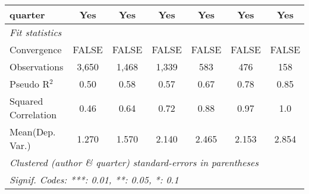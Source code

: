 \begin{tabular}{lcccccc}
   quarter                                                    & Yes          & Yes           & Yes          & Yes           & Yes           & Yes\\  
   \midrule
   \emph{Fit statistics}\\
   Convergence                                                &FALSE         & FALSE         & FALSE        & FALSE         & FALSE         & FALSE\\  
   Observations                                               & 3,650        & 1,468         & 1,339        & 583           & 476           & 158\\  
   Pseudo R$^2$                                               & 0.50         & 0.58          & 0.57         & 0.67          & 0.78          & 0.85\\  
   Squared Correlation                                        & 0.46         & 0.64          & 0.72         & 0.88          & 0.97          & 1.0\\  
Mean(Dep. Var.) & 1.270 & 1.570 & 2.140 & 2.465 & 2.153 & 2.854 \\
   \midrule \midrule
   \multicolumn{7}{l}{\emph{Clustered (author \& quarter) standard-errors in parentheses}}\\
   \multicolumn{7}{l}{\emph{Signif. Codes: ***: 0.01, **: 0.05, *: 0.1}}\\
\end{tabular}
\par\endgroup

